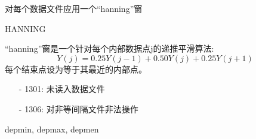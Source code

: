 \label{cmd:hanning}

对每个数据文件应用一个``hanning''窗

\begin{SACSTX}
HANNING
\end{SACSTX}

``hanning''窗是一个针对每个内部数据点j的递推平滑算法:
	\[ Y(j)=0.25Y(j-1)+0.50Y(j)+0.25Y(j+1)\]
每个结束点设为等于其最近的内部点。

\begin{itemize}
\item[-]1301: 未读入数据文件
\item[-]1306: 对非等间隔文件非法操作
\end{itemize}

depmin, depmax, depmen
